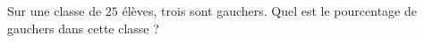 
\begin{exercice}\label{exo2smath-0122}

    Sur une classe de \( 25\) élèves, trois sont gauchers. Quel est le pourcentage de gauchers dans cette classe ?

\end{exercice}
